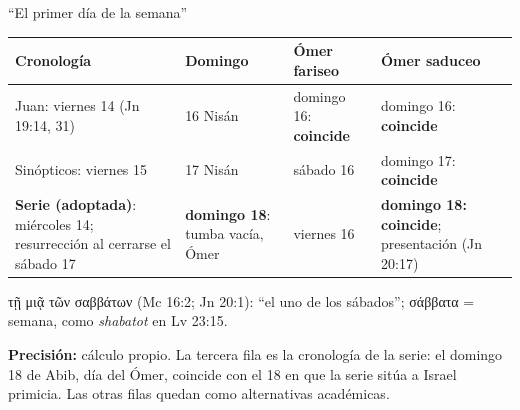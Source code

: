 \documentclass[hyperref={bookmarks=false},aspectratio=169]{beamer}
\newcommand{\grc}[1]{\foreignlanguage{ancientgreek}{#1}}
\newcommand{\precision}[1]{{\footnotesize\color{sepia}\textbf{Precisión:} #1}}
\begin{document}
\begin{frame}{``El primer día de la semana''}
\scriptsize\renewcommand{\arraystretch}{1.12}
\begin{tabular}{@{}L{3.2cm}L{2.4cm}L{2.6cm}L{3.6cm}@{}}
\toprule
\textbf{Cronología} & \textbf{Domingo} & \textbf{Ómer fariseo} & \textbf{Ómer saduceo} \\ \midrule
Juan: viernes 14 (Jn 19:14, 31) & 16 Nisán & domingo 16: \textbf{coincide} & domingo 16: \textbf{coincide} \\
Sinópticos: viernes 15 & 17 Nisán & sábado 16 & domingo 17: \textbf{coincide} \\
\textbf{\color{tierraroja}Serie (adoptada)}: miércoles 14; resurrección al cerrarse el sábado 17 & \textbf{domingo 18}: tumba vacía, Ómer & viernes 16 & \textbf{domingo 18: coincide}; presentación (Jn 20:17) \\
\bottomrule
\end{tabular}\par\medskip
\small\RaggedRight \grc{τῇ μιᾷ τῶν σαββάτων} (Mc 16:2; Jn 20:1): ``el uno de los sábados''; \grc{σάββατα} = semana, como \emph{shabatot} en Lv 23:15.\par\smallskip
\precision{cálculo propio. La tercera fila es la cronología de la serie: el domingo 18 de Abib, día del Ómer, coincide con el 18 en que la serie sitúa a Israel primicia. Las otras filas quedan como alternativas académicas.}
\end{frame}
\end{document}
